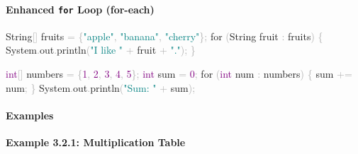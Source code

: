 \documentclass[
  justified,
  openright,
]{tufte-book}
\let\subsubsection\paragraph
\let\paragraph\paragraph
\newcommand{\BuiltInTok}[1]{#1}
\newcommand{\ControlFlowTok}[1]{\textcolor{BrandBlue}{#1}}
\newcommand{\DataTypeTok}[1]{\textcolor{Purple}{#1}}
\newcommand{\DecValTok}[1]{\textcolor{Purple}{#1}}
\newcommand{\FunctionTok}[1]{\textcolor{BrandBlue}{#1}}
\newcommand{\NormalTok}[1]{#1}
\newcommand{\OperatorTok}[1]{\textcolor{DarkGray}{#1}}
\newcommand{\StringTok}[1]{\textcolor{Teal}{#1}}
\newenvironment{Shaded}{%
  \begin{snugshade}
}{%
  \end{snugshade}
}
\let\subsubsection\paragraph
\let\paragraph\paragraph
\begin{document}
\subsubsection{\texorpdfstring{Enhanced \texttt{for} Loop
(for-each)}{Enhanced for Loop (for-each)}}\label{enhanced-for-loop-for-each}

\begin{Shaded}
\begin{Highlighting}[]
\BuiltInTok{String}\OperatorTok{[]}\NormalTok{ fruits }\OperatorTok{=} \OperatorTok{\{}\StringTok{"apple"}\OperatorTok{,} \StringTok{"banana"}\OperatorTok{,} \StringTok{"cherry"}\OperatorTok{\};}
\ControlFlowTok{for} \OperatorTok{(}\BuiltInTok{String}\NormalTok{ fruit }\OperatorTok{:}\NormalTok{ fruits}\OperatorTok{)} \OperatorTok{\{}
    \BuiltInTok{System}\OperatorTok{.}\FunctionTok{out}\OperatorTok{.}\FunctionTok{println}\OperatorTok{(}\StringTok{"I like "} \OperatorTok{+}\NormalTok{ fruit }\OperatorTok{+} \StringTok{"."}\OperatorTok{);}
\OperatorTok{\}}

\DataTypeTok{int}\OperatorTok{[]}\NormalTok{ numbers }\OperatorTok{=} \OperatorTok{\{}\DecValTok{1}\OperatorTok{,} \DecValTok{2}\OperatorTok{,} \DecValTok{3}\OperatorTok{,} \DecValTok{4}\OperatorTok{,} \DecValTok{5}\OperatorTok{\};}
\DataTypeTok{int}\NormalTok{ sum }\OperatorTok{=} \DecValTok{0}\OperatorTok{;}
\ControlFlowTok{for} \OperatorTok{(}\DataTypeTok{int}\NormalTok{ num }\OperatorTok{:}\NormalTok{ numbers}\OperatorTok{)} \OperatorTok{\{}
\NormalTok{    sum }\OperatorTok{+=}\NormalTok{ num}\OperatorTok{;}
\OperatorTok{\}}
\BuiltInTok{System}\OperatorTok{.}\FunctionTok{out}\OperatorTok{.}\FunctionTok{println}\OperatorTok{(}\StringTok{"Sum: "} \OperatorTok{+}\NormalTok{ sum}\OperatorTok{);}
\end{Highlighting}
\end{Shaded}

\subsubsection{Examples}\label{examples-4}

\textbf{Example 3.2.1: Multiplication Table}
\end{document}
